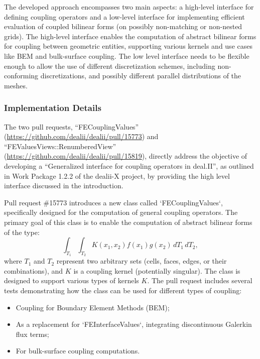 \documentclass[a4paper,12pt]{article}
\begin{document}
    The developed approach encompasses two main aspects: a high-level interface
    for defining coupling operators and a low-level interface for implementing
    efficient evaluation of coupled bilinear forms (on possibly non-matching or
    non-nested grids). The high-level interface enables the computation of
    abstract bilinear forms for coupling between geometric entities, supporting
    various kernels and use cases like BEM and bulk-surface coupling. The low
    level interface needs to be flexible enough to allow the use of different
    discretization schemes, including non-conforming discretizations, and
    possibly different parallel distributions of the meshes.

    \subsubsection{Implementation Details} 

    The two pull requests, ``FECouplingValues''
    (\url{https://github.com/dealii/dealii/pull/15773}) and
    ``FEValuesViews::RenumberedView''
    (\url{https://github.com/dealii/dealii/pull/15819}), directly address the
    objective of developing a ``Generalized interface for coupling operators in
    deal.II'', as outlined in Work Package 1.2.2 of the dealii-X project, by
    providing the high level interface discussed in the introduction.

    Pull request \#15773 introduces a new class called `FECouplingValues`, specifically designed for the computation of general coupling operators. The primary goal of this class is to enable the computation of abstract bilinear forms of the type:
    $$ \int_{T_1} \int_{T_2} K(x_1, x_2) f(x_1) g(x_2) \, dT_1 \, dT_2, $$ where
    $T_1$ and $T_2$ represent two arbitrary sets (cells, faces, edges, or their
    combinations), and $K$ is a coupling kernel (potentially singular). The
    class is designed to support various types of kernels $K$. The pull request
    includes several tests demonstrating how the class can be used for different
    types of coupling:
    \begin{itemize}
        \item Coupling for Boundary Element Methods (BEM);
        \item As a replacement for `FEInterfaceValues`, integrating
        discontinuous Galerkin flux terms;
        \item For bulk-surface coupling computations.
    \end{itemize}
\end{document}
